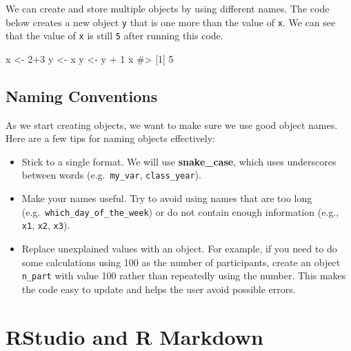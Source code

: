 \documentclass[
  letterpaper,
]{krantz}
\makeatletter
\newenvironment{Shaded}{\begin{snugshade}}{\end{snugshade}}
\newcommand{\CommentTok}[1]{\textcolor[rgb]{0.37,0.37,0.37}{#1}}
\newcommand{\DecValTok}[1]{\textcolor[rgb]{0.68,0.00,0.00}{#1}}
\newcommand{\NormalTok}[1]{\textcolor[rgb]{0.00,0.23,0.31}{#1}}
\newcommand{\OtherTok}[1]{\textcolor[rgb]{0.00,0.23,0.31}{#1}}
\newcommand{\SpecialCharTok}[1]{\textcolor[rgb]{0.37,0.37,0.37}{#1}}
\providecommand{\tightlist}{%
  \setlength{\itemsep}{0pt}\setlength{\parskip}{0pt}}\usepackage{longtable,booktabs,array}
\newenvironment{kframe}{%
\medskip{}
\setlength{\fboxsep}{.8em}
 \def\at@end@of@kframe{}%
 \ifinner\ifhmode%
  \def\at@end@of@kframe{\end{minipage}}%
  \begin{minipage}{\columnwidth}%
 \fi\fi%
 \def\FrameCommand##1{\hskip\@totalleftmargin \hskip-\fboxsep
 \colorbox{shadecolor}{##1}\hskip-\fboxsep
     \hskip-\linewidth \hskip-\@totalleftmargin \hskip\columnwidth}%
 \MakeFramed {\advance\hsize-\width
   \@totalleftmargin\z@ \linewidth\hsize
   \@setminipage}}%
 {\par\unskip\endMakeFramed%
 \at@end@of@kframe}
\renewenvironment{Shaded}{\begin{kframe}}{\end{kframe}}
\makeatother
\begin{document}
We can create and store multiple objects by using different names. The
code below creates a new object \texttt{y} that is one more than the
value of \texttt{x}. We can see that the value of \texttt{x} is still
\texttt{5} after running this code.

\begin{Shaded}
\begin{Highlighting}[]
\NormalTok{x }\OtherTok{\textless{}{-}} \DecValTok{2}\SpecialCharTok{+}\DecValTok{3}
\NormalTok{y }\OtherTok{\textless{}{-}}\NormalTok{ x}
\NormalTok{y }\OtherTok{\textless{}{-}}\NormalTok{ y }\SpecialCharTok{+} \DecValTok{1}
\NormalTok{x}
\CommentTok{\#\textgreater{} [1] 5}
\end{Highlighting}
\end{Shaded}

\subsection{Naming Conventions}\label{naming-conventions}

As we start creating objects, we want to make sure we use good object
names. Here are a few tips for naming objects effectively:

\begin{itemize}
\tightlist
\item
  Stick to a single format. We will use \textbf{snake\_case}, which uses
  underscores between words (e.g.~\texttt{my\_var},
  \texttt{class\_year}).\\
\item
  Make your names useful. Try to avoid using names that are too long\\
  (e.g.~\texttt{which\_day\_of\_the\_week}) or do not contain enough
  information (e.g., \texttt{x1}, \texttt{x2}, \texttt{x3}).\\
\item
  Replace unexplained values with an object. For example, if you need to
  do some calculations using 100 as the number of participants, create
  an object \texttt{n\_part} with value 100 rather than repeatedly using
  the number. This makes the code easy to update and helps the user
  avoid possible errors.
\end{itemize}

\section{RStudio and R Markdown}\label{rstudio-and-r-markdown}
\end{document}
